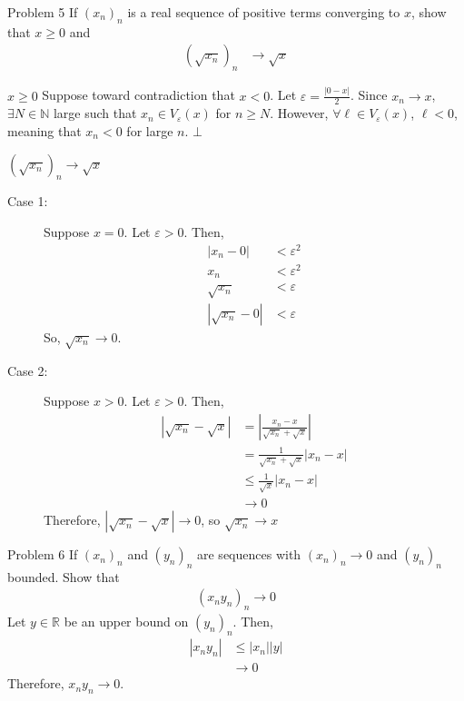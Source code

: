 \documentclass[10pt]{extarticle}
\newcommand{\N}{\mathbb{N}}
\newcommand{\R}{\mathbb{R}}
\begin{document}
  \begin{problem}{Problem 5}
    If $(x_n)_n$ is a real sequence of positive terms converging to $x$, show that $x \geq 0$ and 
    \begin{align*}
      \left(\sqrt{x_n}\right)_n &\rightarrow \sqrt{x}
    \end{align*}
    \tcblower
    \begin{problem}{$x \geq 0$}
      Suppose toward contradiction that $x < 0$. Let $\varepsilon = \frac{|0-x|}{2}$. Since $x_n \rightarrow x$, $\exists N\in \N$ large such that $x_n\in V_{\varepsilon}(x)$ for $n\geq N$. However, $\forall \ell\in V_{\varepsilon}(x)$, $\ell < 0$, meaning that $x_n < 0$ for large $n$. $\bot$
    \end{problem}
    \begin{problem}{$\left(\sqrt{x_n}\right)_n\rightarrow \sqrt{x}$}
      \begin{description}
        \item[Case 1:] Suppose $x = 0$. Let $\varepsilon > 0$. Then,
          \begin{align*}
            |x_n - 0| &< \varepsilon^2\\
            x_n &< \varepsilon^2\\
            \sqrt{x_n} &< \varepsilon\\
            |\sqrt{x_n} - 0| &< \varepsilon
          \end{align*}
          So, $\sqrt{x_n} \rightarrow 0$.
        \item[Case 2:] Suppose $x > 0$. Let $\varepsilon > 0$. Then,
          \begin{align*}
            \left|\sqrt{x_n} - \sqrt{x}\right| &= \left|\frac{x_n - x}{\sqrt{x_n} + \sqrt{x}}\right|\\
                                               &= \frac{1}{\sqrt{x_n}+\sqrt{x}}|x_n - x|\\
                                               &\leq \frac{1}{\sqrt{x}}|x_n - x|\\
                                               &\rightarrow 0
          \end{align*}
          Therefore, $|\sqrt{x_n}-\sqrt{x}| \rightarrow 0$, so $\sqrt{x_n}\rightarrow x$
      \end{description}
    \end{problem}
  \end{problem}
  \begin{problem}{Problem 6}
    If $(x_n)_n$ and $(y_n)_n$ are sequences with $(x_n)_n \rightarrow 0$ and $(y_n)_n$ bounded. Show that
    \begin{align*}
      (x_ny_n)_n \rightarrow 0
    \end{align*}
    \tcblower
    Let $y\in\R$ be an upper bound on $\left(y_n\right)_n$. Then,
    \begin{align*}
      |x_ny_n| &\leq |x_n||y|\\
               &\rightarrow 0
    \end{align*}
    Therefore, $x_ny_n \rightarrow 0$.
  \end{problem}
\end{document}
